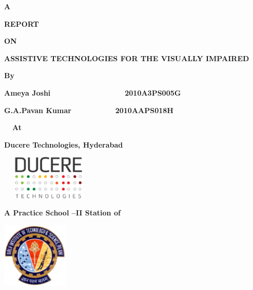 \documentclass[11pt]{report}
\begin{document}
\clearpage\setcounter{page}{1}\pagestyle{Standard}
{\centering {}\bfseries
A
\par}

{\centering{}\bfseries
REPORT
\par}

{\centering{}\bfseries
ON
\par}


\bigskip
{\centering{}\bfseries
ASSISTIVE TECHNOLOGIES FOR THE VISUALLY IMPAIRED
\par}

\bigskip


\bigskip

{\centering{}\bfseries
By
\par}


\bigskip

{\centering{}\bfseries
Ameya Joshi\ \ \ \ \ \ \ \ \ \ \ \ \ \  \  \ \ \ 2010A3PS005G
\par}
{\centering{}\bfseries
G.A.Pavan Kumar \ \ \ \ \ \ \ \ \ \ 2010AAPS018H
\par}


\bigskip

{\centering{}\bfseries
\ \ At
\par}


\bigskip


\bigskip

{\centering{}\bfseries
Ducere Technologies, Hyderabad
\par}

{\centering 
\includegraphics[width=4.575cm,height=2.124cm]{logo.png}
\par}

\bigskip

{\centering{}\bfseries
A Practice School --II Station of
\par}


\bigskip

{\centering 
\includegraphics[width=3.175cm,height=3.124cm]{formatreport-img1.jpg}
\par}
\end{document}

